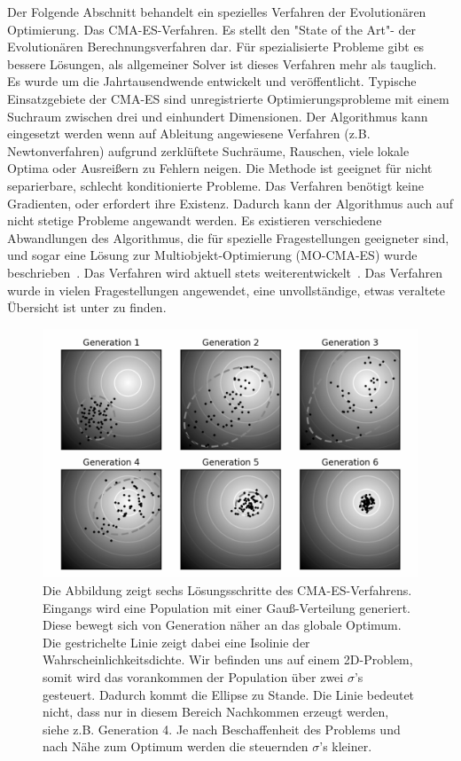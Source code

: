 Der Folgende Abschnitt behandelt ein spezielles Verfahren der Evolutionären Optimierung. Das CMA-ES-Verfahren. Es stellt den "State of the Art"- der Evolutionären Berechnungsverfahren dar. Für spezialisierte Probleme gibt es bessere Lösungen, als allgemeiner Solver ist dieses Verfahren mehr als tauglich. Es wurde um die Jahrtausendwende entwickelt und veröffentlicht. Typische Einsatzgebiete der CMA-ES sind unregistrierte Optimierungsprobleme mit einem Suchraum zwischen drei und einhundert Dimensionen. Der Algorithmus kann eingesetzt werden wenn auf Ableitung angewiesene Verfahren (z.B. Newtonverfahren) aufgrund zerklüftete Suchräume, Rauschen, viele lokale Optima oder Ausreißern zu Fehlern neigen. Die Methode ist geeignet für nicht separierbare, schlecht konditionierte Probleme. Das Verfahren benötigt keine Gradienten, oder erfordert ihre Existenz. Dadurch kann der Algorithmus auch auf nicht stetige Probleme angewandt werden. Es existieren verschiedene Abwandlungen des Algorithmus, die für spezielle Fragestellungen geeigneter sind, und sogar eine Lösung zur Multiobjekt-Optimierung (MO-CMA-ES) wurde beschrieben~\cite{HansenMOO:1}. Das Verfahren wird aktuell stets weiterentwickelt~\cite{hansen2004ecm,hansen2009bbi}. Das Verfahren wurde in vielen Fragestellungen angewendet, eine unvollständige, etwas veraltete Übersicht ist unter \cite{CMAESOverview} zu finden.
%
\begin{figure} [ht!]
\centering
         \caption[Konzept direkter Optimierung mittels CMA-ES]{Die Abbildung zeigt sechs Lösungsschritte des CMA-ES-Verfahrens. Eingangs wird eine Population mit einer Gauß-Verteilung generiert. Diese bewegt sich von Generation näher an das globale Optimum. Die gestrichelte Linie zeigt dabei eine Isolinie der Wahrscheinlichkeitsdichte. Wir befinden uns auf einem 2D-Problem, somit wird das vorankommen der Population über zwei $\sigma$'s gesteuert. Dadurch kommt die Ellipse zu Stande. Die Linie bedeutet nicht, dass nur in diesem Bereich Nachkommen erzeugt werden, siehe z.B. Generation 4. Je nach Beschaffenheit des Problems und nach Nähe zum Optimum werden die steuernden $\sigma$'s kleiner. \cite{Wiki:Images:1}}
         \label{fig:conecpt_cma.es}
         \vspace{0.5cm}
         \includegraphics[width=\textwidth]{img/CMA-ES_algorithm.png}
%      
\end{figure}

